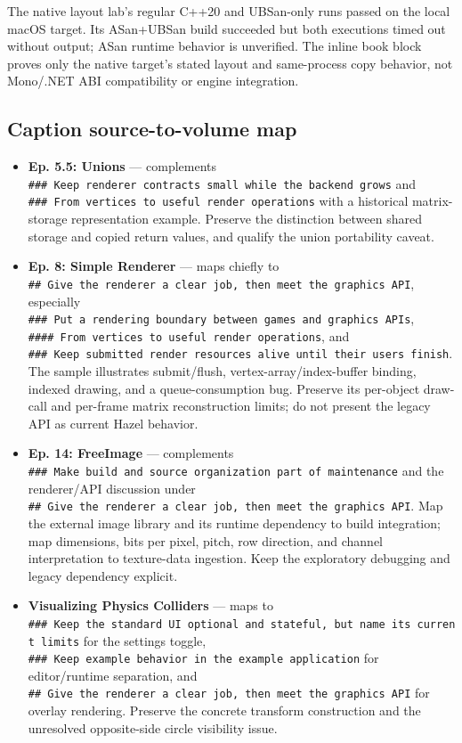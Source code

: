 The native layout lab's regular C++20 and UBSan-only runs passed on the local macOS target. Its ASan+UBSan build succeeded but both executions timed out without output; ASan runtime behavior is unverified. The inline book block proves only the native target's stated layout and same-process copy behavior, not Mono/.NET ABI compatibility or engine integration.

\subsection{Caption source-to-volume map}\label{appendix-877738f6f4d2-caption-source-to-volume-map}

\begin{itemize}
\tightlist
\item
  \textbf{Ep. 5.5: Unions} --- complements \texttt{\#\#\#\ Keep\ renderer\ contracts\ small\ while\ the\ backend\ grows} and \texttt{\#\#\#\ From\ vertices\ to\ useful\ render\ operations} with a historical matrix-storage representation example. Preserve the distinction between shared storage and copied return values, and qualify the union portability caveat.
\item
  \textbf{Ep. 8: Simple Renderer} --- maps chiefly to \texttt{\#\#\ Give\ the\ renderer\ a\ clear\ job,\ then\ meet\ the\ graphics\ API}, especially \texttt{\#\#\#\ Put\ a\ rendering\ boundary\ between\ games\ and\ graphics\ APIs}, \texttt{\#\#\#\#\ From\ vertices\ to\ useful\ render\ operations}, and \texttt{\#\#\#\ Keep\ submitted\ render\ resources\ alive\ until\ their\ users\ finish}. The sample illustrates submit/flush, vertex-array/index-buffer binding, indexed drawing, and a queue-consumption bug. Preserve its per-object draw-call and per-frame matrix reconstruction limits; do not present the legacy API as current Hazel behavior.
\item
  \textbf{Ep. 14: FreeImage} --- complements \texttt{\#\#\#\ Make\ build\ and\ source\ organization\ part\ of\ maintenance} and the renderer/API discussion under \texttt{\#\#\ Give\ the\ renderer\ a\ clear\ job,\ then\ meet\ the\ graphics\ API}. Map the external image library and its runtime dependency to build integration; map dimensions, bits per pixel, pitch, row direction, and channel interpretation to texture-data ingestion. Keep the exploratory debugging and legacy dependency explicit.
\item
  \textbf{Visualizing Physics Colliders} --- maps to \texttt{\#\#\#\ Keep\ the\ standard\ UI\ optional\ and\ stateful,\ but\ name\ its\ current\ limits} for the settings toggle, \texttt{\#\#\#\ Keep\ example\ behavior\ in\ the\ example\ application} for editor/runtime separation, and \texttt{\#\#\ Give\ the\ renderer\ a\ clear\ job,\ then\ meet\ the\ graphics\ API} for overlay rendering. Preserve the concrete transform construction and the unresolved opposite-side circle visibility issue.

\end{itemize}
